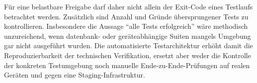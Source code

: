 \begin{neu}
Für eine belastbare Freigabe darf daher nicht allein der Exit-Code eines Testlaufs betrachtet werden. Zusätzlich sind Anzahl und Gründe übersprungener Tests zu kontrollieren. Insbesondere die Aussage ``alle Tests erfolgreich'' wäre methodisch unzureichend, wenn datenbank- oder geräteabhängige Suiten mangels Umgebung gar nicht ausgeführt wurden. Die automatisierte Testarchitektur erhöht damit die Reproduzierbarkeit der technischen Verifikation, ersetzt aber weder die Kontrolle der konkreten Testumgebung noch manuelle Ende-zu-Ende-Prüfungen auf realen Geräten und gegen eine Staging-Infrastruktur.
\end{neu}
